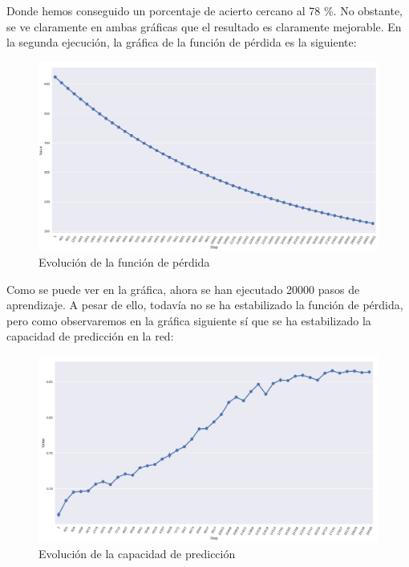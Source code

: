 \documentclass[11pt]{article}
\theoremstyle{plain}
\theoremstyle{definition}
\begin{document}
Donde hemos conseguido un porcentaje de acierto cercano al 78 \%. No
obstante, se ve claramente en ambas gráficas que el resultado es
claramente mejorable. En la segunda ejecución, la gráfica de la
función de pérdida es la siguiente:

\begin{figure}[H]
  \centering \includegraphics[width=.95\textwidth]{imgs/loss_wd_2}
  \caption{Evolución de la función de pérdida}
\end{figure}

Como se puede ver en la gráfica, ahora se han ejecutado 20000 pasos de
aprendizaje. A pesar de ello, todavía no se ha estabilizado la función
de pérdida, pero como observaremos en la gráfica siguiente sí que se
ha estabilizado la capacidad de predicción en la red:

\begin{figure}[H]
  \centering \includegraphics[width=.95\textwidth]{imgs/accuracy_wd_2}
  \caption{Evolución de la capacidad de predicción}
\end{figure}
\end{document}
